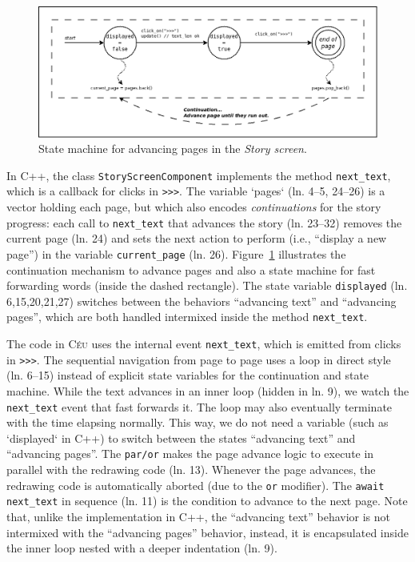 \documentclass{vgtc}                          %
\newcommand{\CEU}{\textsc{C\'{e}u}\xspace}
\newcommand{\code}[1] {{\small{\texttt{#1}}}}
\begin{document}
\begin{figure}[t]
\centering
\includegraphics[width=\columnwidth]{story}
\caption{State machine for advancing pages in the \emph{Story screen}.
\label{fig.story}
}
\end{figure}

In C++, the class \code{StoryScreenComponent} implements the method
\code{next\_text}, which is a callback for clicks in \code{>>>}.
%
The variable `pages` (ln. 4--5, 24--26) is a vector holding each page, but
which also encodes \emph{continuations} for the story progress:
each call to \code{next\_text} that advances the story (ln. 23--32) removes the 
current page (ln. 24) and sets the next action to perform (i.e., ``display a
new page'') in the variable \code{current\_page} (ln. 26).
Figure~\ref{fig.story} illustrates the continuation mechanism to advance 
pages and also a state machine for fast forwarding words (inside the dashed
rectangle).
The state variable \code{displayed} (ln. 6,15,20,21,27) switches between the
behaviors ``advancing text'' and ``advancing pages'', which are both handled
intermixed inside the method \code{next\_text}.

The code in \CEU uses the internal event \code{next\_text}, which is emitted
from clicks in \code{>>>}.
%
The sequential navigation from page to page uses a loop in direct style
(ln. 6--15) instead of explicit state variables for the continuation and state
machine.
While the text advances in an inner loop (hidden in ln. 9), we watch the
\code{next\_text} event that fast forwards it.
The loop may also eventually terminate with the time elapsing normally.
This way, we do not need a variable (such as `displayed` in C++) to switch 
between the states ``advancing text'' and ``advancing pages''.
The \code{par/or} makes the page advance logic to execute in parallel with the
redrawing code (ln. 13).
Whenever the page advances, the redrawing code is automatically aborted
(due to the \code{or} modifier).
The \code{await next\_text} in sequence (ln. 11) is the condition to advance to
the next page.
%
Note that, unlike the implementation in C++, the ``advancing text'' behavior is
not intermixed with the ``advancing pages'' behavior, instead, it is
encapsulated inside the inner loop nested with a deeper indentation (ln. 9).
\end{document}
